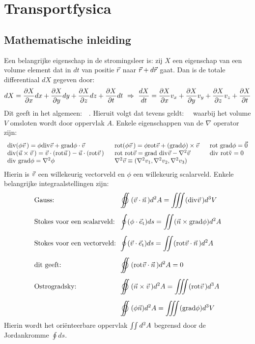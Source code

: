 \documentclass[twoside]{report}
\begin{document}
\chapter{Transportfysica}
\section{Mathematische inleiding}
Een belangrijke eigenschap in de stromingsleer is: zij $X$ een eigenschap
van een volume element dat in $dt$ van positie $\vec{r}$ naar $\vec{r}+d\vec{r}$ gaat.
Dan is de totale differentiaal $dX$ gegeven door:
\[
dX=\frac{\partial X}{\partial x}dx+\frac{\partial X}{\partial y}dy+\frac{\partial X}{\partial z}dz+\frac{\partial X}{\partial t}dt~\Rightarrow~
\frac{dX}{dt}=\frac{\partial X}{\partial x}v_x+\frac{\partial X}{\partial y}v_y+\frac{\partial X}{\partial z}v_z+\frac{\partial X}{\partial t}
\]
Dit geeft in het algemeen:~~.
\npar
Hieruit volgt dat tevens geldt:~~
\npar
waarbij het volume $V$ omsloten wordt door oppervlak $A$.
Enkele eigenschappen van de $\nabla$ operator zijn:
\[
\begin{array}{l@{~~~~~}l@{~~~~~}l}
{\rm div}(\phi\vv\,)=\phi{\rm div}\vv+{\rm grad}\phi\cdot\vv&
{\rm rot}(\phi\vv\,)=\phi{\rm rot}\vv+({\rm grad}\phi)\times\vv&{\rm rot~grad}\phi=\vec{0}\\
{\rm div}(\vec{u}\times\vv\,)=\vv\cdot({\rm rot}\vvec{u})-\vec{u}\cdot({\rm rot}\vv\,)&
{\rm rot~rot}\vv={\rm grad~div}\vv-\nabla^2\vv&{\rm div~rot\vv}=0\\
{\rm div~grad}\phi=\nabla^2\phi&\nabla^2\vv\equiv(\nabla^2v_1,\nabla^2v_2,\nabla^2v_3)
\end{array}
\]
Hierin  is $\vec{v}$ een willekeurig vectorveld en $\phi$ een willekeurig
scalarveld. Enkele belangrijke integraalstellingen zijn:
\[
\begin{array}{l@{~~}l}
\mbox{Gauss:}&\displaystyle\oiint(\vv\cdot\vvec{n})d^2A=\iiint({\rm div}\vv\,)d^3V\\[5mm]
\mbox{Stokes voor een scalarveld:}&\displaystyle\oint(\phi\cdot\e{t})ds=\iint(\vec{n}\times{\rm grad}\phi)d^2A\\[5mm]
\mbox{Stokes voor een vectorveld:}&\displaystyle\oint(\vv\cdot\e{t})ds=\iint({\rm rot}\vv\cdot\vvec{n})d^2A\\[5mm]
\mbox{dit geeft:}&\displaystyle\oiint({\rm rot}\vv\cdot\vvec{n})d^2A=0\\[5mm]
\mbox{Ostrogradsky:}&\displaystyle\oiint(\vec{n}\times\vv\,)d^2A=\iiint({\rm rot}\vv\,)d^3A\\[5mm]
\mbox{}&\displaystyle\oiint(\phi\vec{n})d^2A=\iiint({\rm grad}\phi)d^3V
\end{array}
\]
Hierin wordt het ori\"enteerbare oppervlak $\int\hspace{-1mm}\int d^2A$
begrensd door de Jordankromme $\oint ds$.
\end{document}
